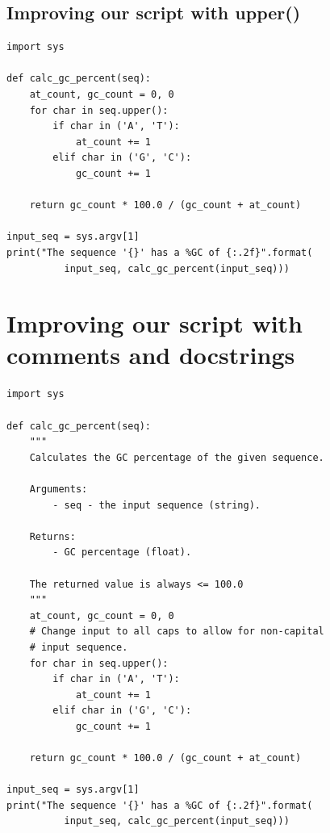 \documentclass[aspectratio=1610,slidestop]{beamer}
\newenvironment{pythonfile}[1]
 {\begin{tcolorbox}[title=#1,
                    title filled=false,
                    coltitle=LUMCDonkerblauw,
                    fonttitle=\scriptsize,
                    fontupper=\footnotesize,
                    enhanced,
                    drop small lifted shadow,
                    boxrule=0.1mm,
                    leftrule=5mm,
                    rulecolor=white,
                    left=0.1cm,
                    colback=white!92!black,
                    colframe=scriptback]}
 {\end{tcolorbox}}
\begin{document}
\subsection{Improving our script with upper()}
\begin{pframe}
 \begin{pythonfile}{seq\_toolbox.py}
  \begin{verbatim}
import sys

def calc_gc_percent(seq):
    at_count, gc_count = 0, 0
    for char in seq.upper():
        if char in ('A', 'T'):
            at_count += 1
        elif char in ('G', 'C'):
            gc_count += 1

    return gc_count * 100.0 / (gc_count + at_count)

input_seq = sys.argv[1]
print("The sequence '{}' has a %GC of {:.2f}".format(
          input_seq, calc_gc_percent(input_seq)))
  \end{verbatim}
 \end{pythonfile}
\end{pframe}


\section{Improving our script with comments and docstrings}
\begin{pframe}
  \vspace{-1.2cm}
 \begin{pythonfile}{seq\_toolbox.py}
  \begin{tiny}
  \begin{verbatim}
import sys

def calc_gc_percent(seq):
    """
    Calculates the GC percentage of the given sequence.

    Arguments:
        - seq - the input sequence (string).

    Returns:
        - GC percentage (float).

    The returned value is always <= 100.0
    """
    at_count, gc_count = 0, 0
    # Change input to all caps to allow for non-capital
    # input sequence.
    for char in seq.upper():
        if char in ('A', 'T'):
            at_count += 1
        elif char in ('G', 'C'):
            gc_count += 1

    return gc_count * 100.0 / (gc_count + at_count)

input_seq = sys.argv[1]
print("The sequence '{}' has a %GC of {:.2f}".format(
          input_seq, calc_gc_percent(input_seq)))
  \end{verbatim}
  \end{tiny}
 \end{pythonfile}
\end{pframe}
\end{document}
